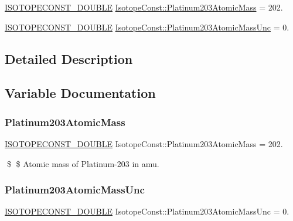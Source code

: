 \begin{DoxyCompactItemize}
\item 
\mbox{\hyperlink{group___isotope_const-_macros_ga8f45a7272ce02c0b4c65c44636ed719a}{I\+S\+O\+T\+O\+P\+E\+C\+O\+N\+S\+T\+\_\+\+D\+O\+U\+B\+LE}} \mbox{\hyperlink{group___isotope_const-_platinum-_pt203_gabf85a1a75f744ed606b9be3486b19008}{Isotope\+Const\+::\+Platinum203\+Atomic\+Mass}} = 202.
\item 
\mbox{\hyperlink{group___isotope_const-_macros_ga8f45a7272ce02c0b4c65c44636ed719a}{I\+S\+O\+T\+O\+P\+E\+C\+O\+N\+S\+T\+\_\+\+D\+O\+U\+B\+LE}} \mbox{\hyperlink{group___isotope_const-_platinum-_pt203_gabe802b23c135dae4dc61dbf9092fdf3c}{Isotope\+Const\+::\+Platinum203\+Atomic\+Mass\+Unc}} = 0.
\end{DoxyCompactItemize}


\subsection{Detailed Description}


\subsection{Variable Documentation}
\mbox{\label{group___isotope_const-_platinum-_pt203_gabf85a1a75f744ed606b9be3486b19008}} 
\subsubsection{\texorpdfstring{Platinum203\+Atomic\+Mass}{Platinum203AtomicMass}}
{\footnotesize\ttfamily \mbox{\hyperlink{group___isotope_const-_macros_ga8f45a7272ce02c0b4c65c44636ed719a}{I\+S\+O\+T\+O\+P\+E\+C\+O\+N\+S\+T\+\_\+\+D\+O\+U\+B\+LE}} Isotope\+Const\+::\+Platinum203\+Atomic\+Mass = 202.}

\$ \$ Atomic mass of Platinum-\/203 in amu. \mbox{\label{group___isotope_const-_platinum-_pt203_gabe802b23c135dae4dc61dbf9092fdf3c}} 
\subsubsection{\texorpdfstring{Platinum203\+Atomic\+Mass\+Unc}{Platinum203AtomicMassUnc}}
{\footnotesize\ttfamily \mbox{\hyperlink{group___isotope_const-_macros_ga8f45a7272ce02c0b4c65c44636ed719a}{I\+S\+O\+T\+O\+P\+E\+C\+O\+N\+S\+T\+\_\+\+D\+O\+U\+B\+LE}} Isotope\+Const\+::\+Platinum203\+Atomic\+Mass\+Unc = 0.}

